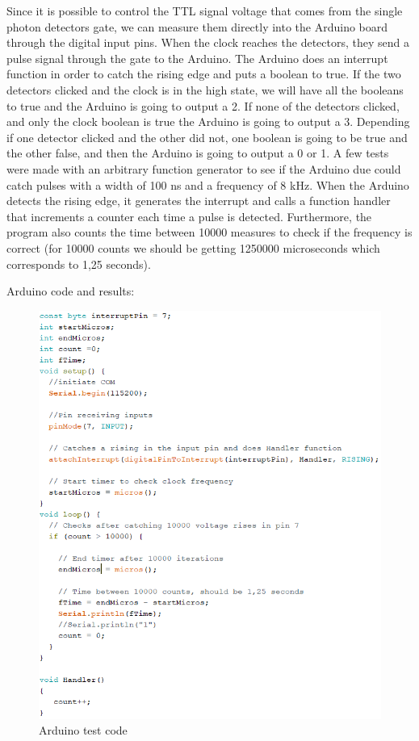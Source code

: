 \begin{refsection}
Since it is possible to control the TTL signal voltage that comes from the single photon detectors gate, we can measure them directly into the Arduino board through the digital input pins. When the clock reaches the detectors, they send a pulse signal through the gate to the Arduino. The Arduino does an interrupt function in order to catch the rising edge and puts a boolean to true. If the two detectors clicked and the clock is in the high state, we will have all the booleans to true and the Arduino is going to output a 2. If none of the detectors clicked, and only the clock boolean is true the Arduino is going to output a 3. Depending if one detector clicked and the other did not, one boolean is going to be true and the other false, and then the Arduino is going to output a 0 or 1.
A few tests were made with an arbitrary function generator to see if the Arduino due could catch pulses with a width of 100 ns and a frequency of 8 kHz. When the Arduino detects the rising edge, it generates the interrupt and calls a function handler that increments a counter each time a pulse is detected. Furthermore, the program also counts the time between 10000 measures to check if the frequency is correct (for 10000 counts we should be getting 1250000 microseconds which corresponds to 1,25 seconds). 

\clearpage

Arduino code and results:

\begin{figure}[H]
	\centering
	\includegraphics[width=0.85\linewidth]{./sdf/arduino_quantum_rx/figures/arduinoTest.PNG}
	\caption{Arduino test code}
	\label{montage}
\end{figure}


\end{refsection}
